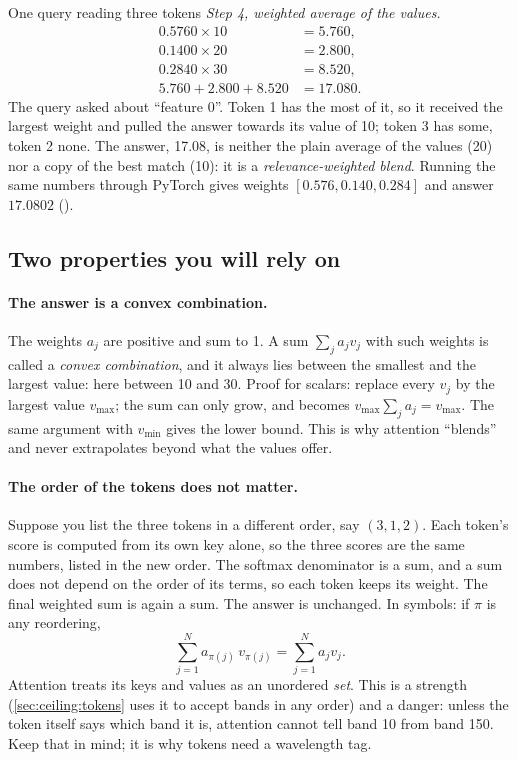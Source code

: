 \begin{worked}[label={we:ceiling:xattn}]{One query reading three tokens}
\emph{Step 4, weighted average of the values.}
\begin{align*}
  0.5760\times10 &= 5.760,\\
  0.1400\times20 &= 2.800,\\
  0.2840\times30 &= 8.520,\\
  5.760 + 2.800 + 8.520 &= 17.080 .
\end{align*}
The query asked about ``feature 0''. Token 1 has the most of it, so it received the largest weight and pulled the answer towards its value of 10; token 3 has some, token 2 none. The answer, 17.08, is neither the plain average of the values (20) nor a copy of the best match (10): it is a \emph{relevance-weighted blend}. Running the same numbers through PyTorch gives weights $[0.576, 0.140, 0.284]$ and answer $17.0802$\tagC{} ().
\end{worked}

\subsection{Two properties you will rely on}

\paragraph{The answer is a convex combination.} The weights $a_j$ are positive and sum to 1. A sum $\sum_j a_j v_j$ with such weights is called a \emph{convex combination}, and it always lies between the smallest and the largest value: here between 10 and 30. Proof for scalars: replace every $v_j$ by the largest value $v_{\max}$; the sum can only grow, and becomes $v_{\max}\sum_j a_j = v_{\max}$. The same argument with $v_{\min}$ gives the lower bound. This is why attention ``blends'' and never extrapolates beyond what the values offer.

\paragraph{The order of the tokens does not matter.} Suppose you list the three tokens in a different order, say $(3, 1, 2)$. Each token's score is computed from its own key alone, so the three scores are the same numbers, listed in the new order. The softmax denominator is a sum, and a sum does not depend on the order of its terms, so each token keeps its weight. The final weighted sum is again a sum. The answer is unchanged. In symbols: if $\pi$ is any reordering,
\begin{equation}\label{eq:ceiling:perm}
  \sum_{j=1}^{N} a_{\pi(j)}\,v_{\pi(j)} = \sum_{j=1}^{N} a_j v_j .
\end{equation}
Attention treats its keys and values as an unordered \emph{set}. This is a strength (\cref{sec:ceiling:tokens} uses it to accept bands in any order) and a danger: unless the token itself says which band it is, attention cannot tell band 10 from band 150. Keep that in mind; it is why tokens need a wavelength tag.

